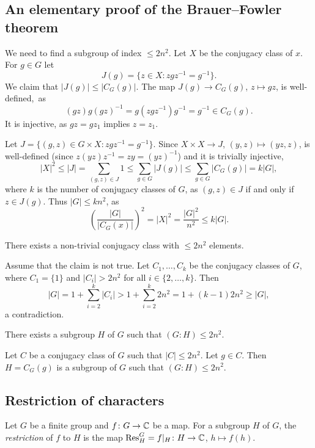 \begin{optional}
\subsection{An elementary proof of the Brauer--Fowler theorem}

We need to find a subgroup of index $\leq 2n^2$. 
Let $X$ be the conjugacy class of $x$. For $g\in G$ let
\[
J(g)=\{z\in X:zgz^{-1}=g^{-1}\}.
\]
We claim that $|J(g)|\leq|C_G(g)|$. The map $J(g)\to C_G(g)$, $z\mapsto gz$, 
is well-defined,~as 
\[
(gz)g(gz)^{-1}=g(zgz^{-1})g^{-1}=g^{-1}\in C_G(g).
\]
It is injective, as $gz=gz_1$ implies $z=z_1$.

Let $J=\{(g,z)\in G\times X:zgz^{-1}=g^{-1}\}$.  
Since $X\times X\to J$, $(y,z)\mapsto (yz,z)$, 
is well-defined (since $z(yz)z^{-1}=zy=(yz)^{-1}$) and
it is trivially injective, 
\[
|X|^2\leq |J|=\sum_{(g,z)\in J}1\leq\sum_{g\in G}|J(g)|
\leq\sum_{g\in G}|C_G(g)|=k|G|,
\]
where $k$ is the number of conjugacy classes of $G$, 
as $(g,z)\in J$ if and only if $z\in J(g)$. Thus $|G|\leq kn^2$, as
\[
\left(\frac{|G|}{|C_G(x)|}\right)^2=|X|^2=\frac{|G|^2}{n^2}\leq k|G|.
\]

\begin{claim}
    There exists a non-trivial conjugacy class with $\leq 2n^2$ elements.
\end{claim}

Assume that the claim is not true. Let
$C_1,\dots,C_k$ be the conjugacy classes of $G$, where 
$C_1=\{1\}$ and $|C_i|>2n^2$ for all $i\in\{2,\dots,k\}$. Then
\[
|G|=1+\sum_{i=2}^k|C_i|>1+\sum_{i=2}^k2n^2=1+(k-1)2n^2\geq |G|,
\]
a contradiction. 

\begin{claim}
    There exists a subgroup $H$ of $G$ such that
    $(G:H)\leq 2n^2$.
\end{claim}

Let $C$ be a conjugacy class of $G$ such that
$|C|\leq 2n^2$. Let $g\in C$.
Then $H=C_G(g)$ is a subgroup of $G$ such that
$(G:H)\leq 2n^2$.
\end{optional}


\subsection{Restriction of characters}

\begin{definition}
    Let $G$ be a finite group and $f\colon G\to\mathbb{C}$ be
    a map. For a subgroup $H$ of $G$, the \emph{restriction}
    of $f$ to $H$ is the map 
    $\operatorname{Res}_H^G=f|_H\colon H\to\mathbb{C}$, $h\mapsto f(h)$. 
\end{definition}

